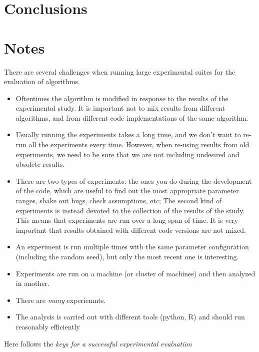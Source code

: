\documentclass{llncs}
\begin{document}
\section{Conclusions}




\appendix

\section{Notes}

There are several challenges when running large experimental suites
for the evaluation of algorithms.

\begin{itemize}
\item Oftentimes the algorithm is modified in response to the results
  of the experimental study. It is important not to mix results from
  different algorithms, and from different code implementations of the
  same algorithm.
\item Usually running the experiments takes a long time, and we don't
  want to re-run all the experiments every time. However, when
  re-using results from old experiments, we need to be sure that we
  are not including undesired and obsolete results.
\item There are two types of experiments: the ones you do during the
  development of the code, which are useful to find out the most
  appropriate parameter ranges, shake out bugs, check assumptions,
  etc; The second kind of experiments is instead devoted to the
  collection of the results of the study. This means that experiments
  are run over a long span of time. It is very important that results
  obtained with different code versions are not mixed.
\item An experiment is run multiple times with the same parameter
  configuration (including the random seed), but only the most recent
  one is interesting.
\item Experiments are run on a machine (or cluster of machines) and then
  analyzed in another.
\item There are \emph{many} experiemnts.
\item The analysis is carried out with different tools (python, R) and
  should run reasonably efficiently
\end{itemize}

Here follows the \emph{keys for a successful experimental evaluation}
\end{document}
